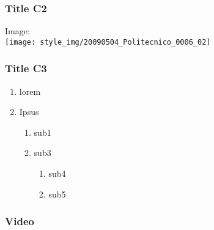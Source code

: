 \documentclass{beamer}
\begin{document}

\begin{frame}
\frametitle{Title C2}


\centering
Image:\\
\bigskip\bigskip
\texttt{[image: style\_img/20090504\_Politecnico\_0006\_02]}

\end{frame}


\begin{frame}
\frametitle{Title C3}


\begin{enumerate}
 \item lorem
 \item Ipsus
 \begin{enumerate}
    \item sub1
    \item sub3
    \begin{enumerate}
      \item sub4
      \item sub5
    \end{enumerate}
 \end{enumerate}
\end{enumerate}


\end{frame}


\begin{frame}
\frametitle{Video}

\end{frame}
\end{document}
